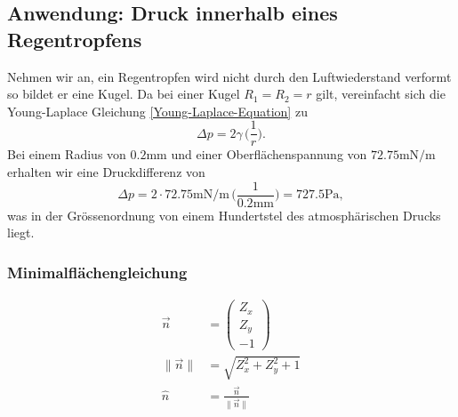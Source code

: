 \begin{refsection}
\subsection{Anwendung: Druck innerhalb eines Regentropfens}
Nehmen wir an, ein Regentropfen wird nicht durch den Luftwiederstand verformt so bildet er eine Kugel. Da bei einer Kugel $R_1=R_2=r$ gilt, vereinfacht sich die Young-Laplace Gleichung \ref{Young-Laplace-Equation} zu
\begin{equation}
\Delta p = 2\gamma \, \bigg(\frac{1}{r}\bigg).
\end{equation}
Bei einem Radius von $0.2\text{mm}$ und einer Oberflächenspannung von $72.75 \text{mN}/\text{m}$ erhalten wir eine Druckdifferenz von
\begin{equation}
\Delta p = 2 \cdot 72.75 \text{mN}/\text{m} \, \bigg(\frac{1}{0.2\text{mm}}\bigg)= 727.5 \text{Pa},
\end{equation}
was in der Grössenordnung von einem Hundertstel des atmosphärischen Drucks liegt. 


\iffalse
\subsubsection{Minimalflächengleichung}\label{MFG}
\begin{equation}
\begin{split}
\vec{n} &= \begin{pmatrix}Z_x \\ Z_y \\ -1\end{pmatrix} \\
\|\vec{n}\| &= \sqrt{Z_x^2+Z_y^2+1} \\
\hat{n} &= \frac{\vec{n}}{\|\vec{n}\|} \\
\end{split}
\end{equation}


\end{refsection}
